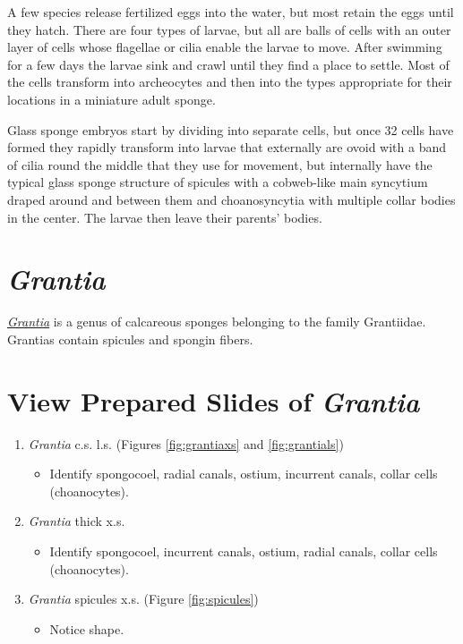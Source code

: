A few species release fertilized eggs into the water, but most retain
the eggs until they hatch. There are four types of larvae, but all are
balls of cells with an outer layer of cells whose flagellae or cilia
enable the larvae to move. After swimming for a few days the larvae sink
and crawl until they find a place to settle. Most of the cells transform
into archeocytes and then into the types appropriate for their locations
in a miniature adult sponge.

Glass sponge embryos start by dividing into separate cells, but once 32
cells have formed they rapidly transform into larvae that externally are
ovoid with a band of cilia round the middle that they use for movement,
but internally have the typical glass sponge structure of spicules with
a cobweb-like main syncytium draped around and between them and
choanosyncytia with multiple collar bodies in the center. The larvae
then leave their parents' bodies.

\section{\texorpdfstring{\emph{Grantia}}{Grantia}}\label{grantia}

\href{https://en.wikipedia.org/wiki/Grantia}{\emph{Grantia}} is a genus
of calcareous sponges belonging to the family Grantiidae. Grantias
contain spicules and spongin fibers.

\section{\texorpdfstring{View Prepared Slides of \emph{Grantia}}{View Prepared Slides of Grantia}}\label{view-prepared-slides}

\begin{enumerate}
\def\labelenumi{\arabic{enumi}.}
\tightlist
\item
  \emph{Grantia} c.s. l.s. (Figures \ref{fig:grantiaxs} and
  \ref{fig:grantials})

  \begin{itemize}
  \tightlist
  \item
    Identify spongocoel, radial canals, ostium, incurrent canals, collar
    cells (choanocytes).
  \end{itemize}
\item
  \emph{Grantia} thick x.s.

  \begin{itemize}
  \tightlist
  \item
    Identify spongocoel, incurrent canals, ostium, radial canals, collar
    cells (choanocytes).
  \end{itemize}
\item
  \emph{Grantia} spicules x.s. (Figure \ref{fig:spicules})

  \begin{itemize}
  \tightlist
  \item
    Notice shape.
  \end{itemize}
\end{enumerate}

